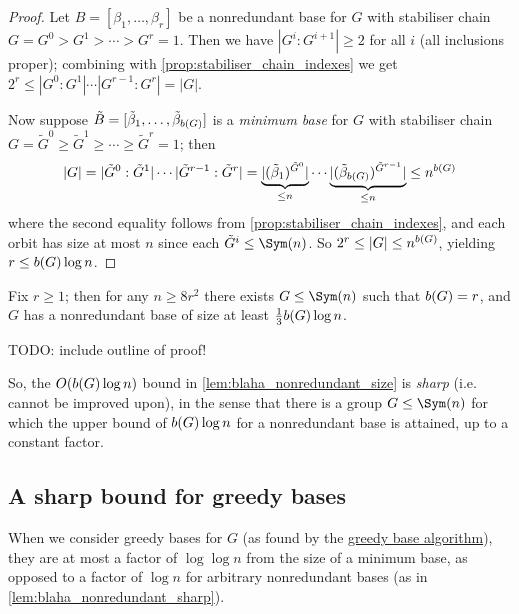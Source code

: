 \begin{proof}
    Let $B = [\beta_1,\dotsc,\beta_r]$ be a nonredundant base for $G$ with stabiliser chain $G = G^0 > G^1 > \dotsb > G^r = 1$. Then we have $|G^i : G^{i+1}| \geq 2$ for all $i$ (all inclusions proper); combining with \autoref{prop:stabiliser_chain_indexes} we get $2^r \leq |G^0 : G^1| \dotsb |G^{r-1} : G^r| = |G|$.

    Now suppose $\tilde B = [\tilde\beta_1,\dotsc,\tilde\beta_{\added{2}{b(G)}}]$ is a \textit{minimum base} for $G$ with stabiliser chain $G = \tilde G^0 \geq \tilde G^1 \geq \dotsb \geq \tilde G^r = 1$; then
    $$|G| = |\tilde G^0 : \tilde G^1| \dotsb |\tilde G^{r-1} : \tilde G^r| = \underbrace{|(\tilde\beta_1)^{\tilde G^0}|}_{\leq n} \dotsb \underbrace{|(\tilde\beta_{\added{2}{b(G)}})^{\tilde G^{r-1}}|}_{\leq n} \leq n^{\added{2}{b(G)}}$$
    where the second equality follows from \autoref{prop:stabiliser_chain_indexes}, and each orbit has size at most $n$ since each $\tilde G^i \leq \Sym(n)$. So $2^r \leq |G| \leq n^{\added{2}{b(G)}}$, yielding $r \leq \added{2}{b(G)}\log n$.
\end{proof}

\begin{lemma}\label{lem:blaha_nonredundant_sharp}
    Fix $r \geq 1$; then for any $n \geq 8r^2$ there exists $G \leq \Sym(n)$ such that $\added{2}{b(G)} = r$, and $G$ has a nonredundant base of size at least $\frac{1}{3}\added{2}{b(G)}\log n$.
\end{lemma}

TODO: include outline of proof!

So, the $O(\added{2}{b(G)}\log n)$ bound in \autoref{lem:blaha_nonredundant_size} is \textit{sharp} (i.e. cannot be improved upon), in the sense that there is a group $G \leq \Sym(n)$ for which the upper bound of $\added{2}{b(G)}\log n$ for a nonredundant base is attained, up to a constant factor.

\subsection{A sharp bound for greedy bases}

When we consider greedy bases for $G$ (as found by the \hyperref[alg:blaha_greedy_base]{greedy base algorithm}), they are at most a factor of $\log\log n$ from the size of a minimum base, as opposed to a factor of $\log n$ for arbitrary nonredundant bases (as in \autoref{lem:blaha_nonredundant_sharp}).

